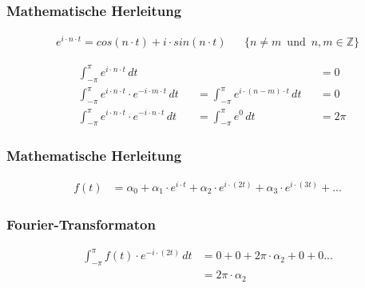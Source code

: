 \begin{frame}
  \frametitle{Mathematische Herleitung}

  \begin{align*}
    e^{i \cdot n \cdot t} = cos(n \cdot t) + i \cdot sin(n \cdot t) && \{ n \not= m \, \text{  und  } \, n, m \in \mathbb{Z} \}
  \end{align*}

  \begin{align*}
    &\int_{-\pi}^{\pi} e^{i \cdot n \cdot t} \, dt &&  &&= 0 \\
    &\int_{-\pi}^{\pi} e^{i \cdot n \cdot t} \cdot e^{-i \cdot m \cdot t} \, dt &&= \int_{-\pi}^{\pi} e^{i \cdot (n - m) \cdot t} \, dt &&= 0 \\
    &\int_{-\pi}^{\pi} e^{i \cdot n \cdot t} \cdot e^{-i \cdot n \cdot t} \, dt &&= \int_{-\pi}^{\pi} e^{0} \, dt &&= 2 \pi
  \end{align*}


\end{frame}

\begin{frame}
  \frametitle{Mathematische Herleitung}

  \begin{align*}
f(t) &= \alpha_0 + \alpha_1 \cdot e^{i \cdot t} + \alpha_2 \cdot e^{i \cdot ( 2 t)} + \alpha_3 \cdot e^{i \cdot (3 t)} + ...
  \end{align*}

\end{frame}

\begin{frame}
  \frametitle{Fourier-Transformaton}

  \begin{align*}
    \int_{-\pi}^{\pi} f(t) \cdot e^{-i \cdot (2 t)} \, dt &= 0 + 0 + 2 \pi \cdot \alpha_2 + 0 + 0 ... \\
    &= 2 \pi \cdot \alpha_2
  \end{align*}

\end{frame}
